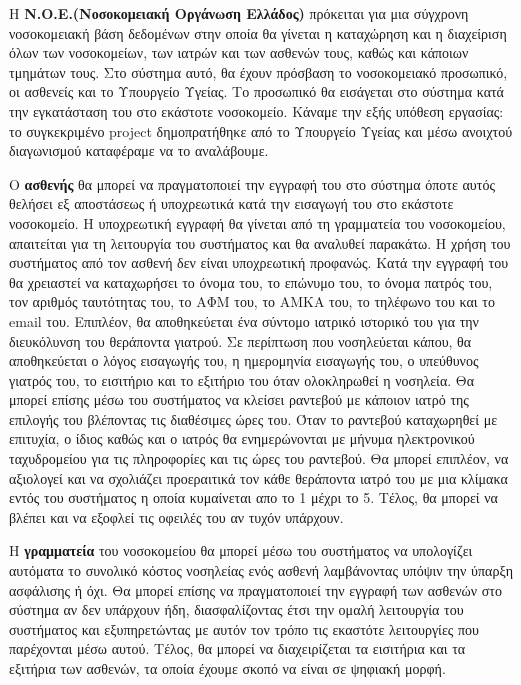 \documentclass[12pt,a4paper,oneside]{article}
\begin{document}
\hspace{1cm} Η \textbf{Ν.Ο.Ε.(Νοσοκομειακή Οργάνωση Ελλάδος)} πρόκειται για μια σύγχρονη νοσοκομειακή βάση δεδομένων στην οποία θα γίνεται η καταχώρηση και η διαχείριση όλων των νοσοκομείων, των ιατρών και των ασθενών τους, καθώς και κάποιων τμημάτων τους. Στο σύστημα αυτό, θα έχουν πρόσβαση το νοσοκομειακό προσωπικό, οι ασθενείς και το Υπουργείο Υγείας. Το προσωπικό θα εισάγεται στο σύστημα κατά την εγκατάσταση του στο εκάστοτε νοσοκομείο. Κάναμε την εξής υπόθεση εργασίας: το συγκεκριμένο project δημοπρατήθηκε από το Υπουργείο Υγείας και μέσω ανοιχτού διαγωνισμού καταφέραμε να το αναλάβουμε.   \par
\hspace{1cm}Ο \textbf{ασθενής} θα μπορεί να πραγματοποιεί την εγγραφή του στο σύστημα όποτε αυτός θελήσει εξ αποστάσεως ή υποχρεωτικά κατά την εισαγωγή του στο εκάστοτε νοσοκομείο. Η υποχρεωτική εγγραφή θα γίνεται από τη γραμματεία του νοσοκομείου, απαιτείται για τη λειτουργία του συστήματος και θα αναλυθεί παρακάτω. Η χρήση του συστήματος από τον ασθενή δεν είναι υποχρεωτική προφανώς. Κατά την εγγραφή του θα χρειαστεί να καταχωρήσει το όνομα του, το επώνυμο του, το όνομα πατρός του, τον αριθμός ταυτότητας του, το ΑΦΜ του, το ΑΜΚΑ του,  το τηλέφωνο του και το email του. Επιπλέον, θα αποθηκεύεται ένα σύντομο ιατρικό ιστορικό του για την διευκόλυνση του θεράποντα γιατρού. Σε περίπτωση που νοσηλεύεται κάπου, θα  αποθηκεύεται ο λόγος εισαγωγής του, η ημερομηνία εισαγωγής του,  ο υπεύθυνος γιατρός του, το εισιτήριο και το εξιτήριο του όταν ολοκληρωθεί η νοσηλεία.  Θα μπορεί επίσης μέσω του συστήματος να κλείσει ραντεβού με κάποιον ιατρό της επιλογής του βλέποντας τις διαθέσιμες ώρες του. Όταν το ραντεβού καταχωρηθεί με επιτυχία, ο ίδιος καθώς και ο ιατρός θα ενημερώνονται με μήνυμα ηλεκτρονικού ταχυδρομείου για τις πληροφορίες και τις ώρες του ραντεβού. Θα μπορεί επιπλέον, να αξιολογεί και να σχολιάζει προεραιτικά τον κάθε θεράποντα ιατρό του με μια κλίμακα εντός του συστήματος η οποία κυμαίνεται απο το 1 μέχρι το 5. Τέλος, θα μπορεί να βλέπει και να εξοφλεί τις  οφειλές του αν τυχόν υπάρχουν. \par
\hspace{1cm}Η \textbf{γραμματεία} του νοσοκομείου θα μπορεί μέσω του συστήματος να υπολογίζει αυτόματα το συνολικό κόστος νοσηλείας ενός ασθενή λαμβάνοντας υπόψιν την ύπαρξη ασφάλισης ή όχι. Θα μπορεί επίσης να πραγματοποιεί την εγγραφή των ασθενών στο σύστημα αν δεν υπάρχουν ήδη, διασφαλίζοντας έτσι την ομαλή λειτουργία του συστήματος και εξυπηρετώντας με αυτόν τον τρόπο τις εκαστότε λειτουργίες που παρέχονται μέσω αυτού. Τέλος, θα μπορεί να διαχειρίζεται τα εισιτήρια και τα εξιτήρια των ασθενών, τα οποία έχουμε σκοπό να είναι σε ψηφιακή μορφή. \par
\end{document}
